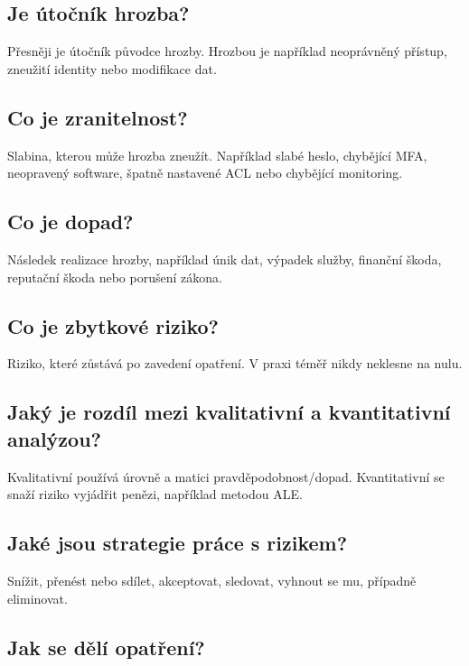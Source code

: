 \subsection*{Je útočník hrozba?}

Přesněji je útočník původce hrozby. Hrozbou je například neoprávněný přístup, zneužití identity nebo modifikace dat.

\subsection*{Co je zranitelnost?}

Slabina, kterou může hrozba zneužít. Například slabé heslo, chybějící MFA, neopravený software, špatně nastavené ACL nebo chybějící monitoring.

\subsection*{Co je dopad?}

Následek realizace hrozby, například únik dat, výpadek služby, finanční škoda, reputační škoda nebo porušení zákona.

\subsection*{Co je zbytkové riziko?}

Riziko, které zůstává po zavedení opatření. V praxi téměř nikdy neklesne na nulu.

\subsection*{Jaký je rozdíl mezi kvalitativní a kvantitativní analýzou?}

Kvalitativní používá úrovně a matici pravděpodobnost/dopad. Kvantitativní se snaží riziko vyjádřit penězi, například metodou ALE.

\subsection*{Jaké jsou strategie práce s rizikem?}

Snížit, přenést nebo sdílet, akceptovat, sledovat, vyhnout se mu, případně eliminovat.

\subsection*{Jak se dělí opatření?}

